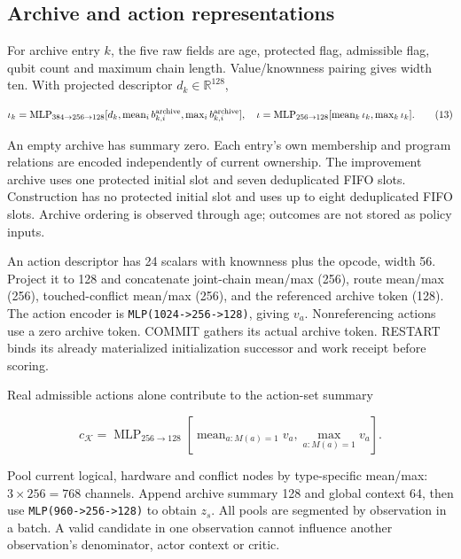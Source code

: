 \documentclass[10pt,a4paper]{article}
\begin{document}
\hypertarget{archive-and-action-representations}{%
\subsection{Archive and action
representations}\label{archive-and-action-representations}}

For archive entry \(k\), the five raw fields are age, protected flag,
admissible flag, qubit count and maximum chain length. Value/knownness
pairing gives width ten. With projected descriptor
\(d_k\in\mathbb R^{128}\),

\[
\iota_k=\operatorname{MLP}_{384\to256\to128}
[d_k,\operatorname{mean}_i b_{k,i}^{\rm archive},\operatorname{max}_i b_{k,i}^{\rm archive}],
\quad
\iota=\operatorname{MLP}_{256\to128}
[\operatorname{mean}_k\iota_k,\operatorname{max}_k\iota_k].
\tag{13}
\]

An empty archive has summary zero. Each entry's own membership and
program relations are encoded independently of current ownership. The
improvement archive uses one protected initial slot and seven
deduplicated FIFO slots. Construction has no protected initial slot and
uses up to eight deduplicated FIFO slots. Archive ordering is observed
through age; outcomes are not stored as policy inputs.

An action descriptor has 24 scalars with knownness plus the opcode,
width 56. Project it to 128 and concatenate joint-chain mean/max (256),
route mean/max (256), touched-conflict mean/max (256), and the
referenced archive token (128). The action encoder is
\texttt{MLP(1024-\textgreater{}256-\textgreater{}128)}, giving \(v_a\).
Nonreferencing actions use a zero archive token. COMMIT gathers its
actual archive token. RESTART binds its already materialized
initialization successor and work receipt before scoring.

Real admissible actions alone contribute to the action-set summary

\[
c_{\mathcal K}=\operatorname{MLP}_{256\to128}
[\operatorname{mean}_{a:M(a)=1}v_a,\operatorname{max}_{a:M(a)=1}v_a].
\tag{14}
\]

Pool current logical, hardware and conflict nodes by type-specific
mean/max: \(3\times256=768\) channels. Append archive summary 128 and
global context 64, then use
\texttt{MLP(960-\textgreater{}256-\textgreater{}128)} to obtain \(z_s\).
All pools are segmented by observation in a batch. A valid candidate in
one observation cannot influence another observation's denominator,
actor context or critic.
\end{document}
